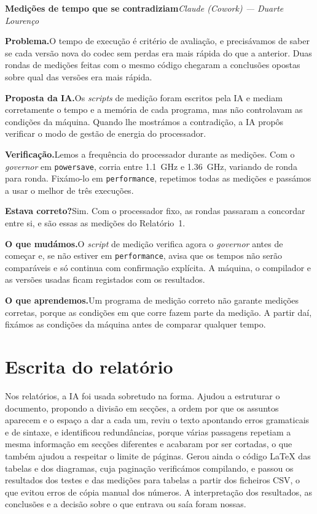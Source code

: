 \documentclass[a4paper,11pt]{article}
\newcommand{\caso}[3]{%
  \par\medskip\noindent\textbf{#1}\hfill{\small\textit{#2 --- #3}}\par\nopagebreak\smallskip}
\newcommand{\campo}[2]{\noindent\textbf{#1}\enspace #2\par}
\newcommand{\problema}[1]{\campo{Problema.}{#1}}
\newcommand{\proposta}[1]{\campo{Proposta da IA.}{#1}}
\newcommand{\verificacao}[1]{\campo{Verificação.}{#1}}
\newcommand{\correto}[1]{\campo{Estava correto?}{#1}}
\newcommand{\alteracoes}[1]{\campo{O que mudámos.}{#1}}
\newcommand{\aprendizagem}[1]{\campo{O que aprendemos.}{#1}}
\begin{document}
\caso{Medições de tempo que se contradiziam}{Claude (Cowork)}{Duarte Lourenço}
\problema{O tempo de execução é critério de avaliação, e precisávamos de saber
se cada versão nova do codec sem perdas era mais rápida do que a anterior. Duas
rondas de medições feitas com o mesmo código chegaram a conclusões opostas
sobre qual das versões era mais rápida.}
\proposta{Os \emph{scripts} de medição foram escritos pela IA e mediam
corretamente o tempo e a memória de cada programa, mas não controlavam as
condições da máquina. Quando lhe mostrámos a contradição, a IA propôs
verificar o modo de gestão de energia do processador.}
\verificacao{Lemos a frequência do processador durante as medições. Com o
\emph{governor} em \texttt{powersave}, corria entre \SI{1,1}{GHz} e
\SI{1,36}{GHz}, variando de ronda para ronda. Fixámo-lo em
\texttt{performance}, repetimos todas as medições e passámos a usar o melhor de
três execuções.}
\correto{Sim. Com o processador fixo, as rondas passaram a concordar entre si,
e são essas as medições do Relatório~1.}
\alteracoes{O \emph{script} de medição verifica agora o \emph{governor} antes de
começar e, se não estiver em \texttt{performance}, avisa que os tempos não serão
comparáveis e só continua com confirmação explícita. A máquina, o compilador e
as versões usadas ficam registados com os resultados.}
\aprendizagem{Um programa de medição correto não garante medições corretas,
porque as condições em que corre fazem parte da medição. A partir daí, fixámos
as condições da máquina antes de comparar qualquer tempo.}

\section{Escrita do relatório}
\label{sec:relatorio}
Nos relatórios, a IA foi usada sobretudo na forma. Ajudou a estruturar o
documento, propondo a divisão em secções, a ordem por que os assuntos aparecem e
o espaço a dar a cada um, reviu o texto apontando erros gramaticais e de
sintaxe, e identificou redundâncias, porque várias passagens repetiam a mesma
informação em secções diferentes e acabaram por ser cortadas, o que também
ajudou a respeitar o limite de páginas. Gerou ainda o código \LaTeX{} das
tabelas e dos diagramas, cuja paginação verificámos compilando, e passou os
resultados dos testes e das medições para tabelas a partir dos ficheiros CSV, o
que evitou erros de cópia manual dos números. A interpretação dos resultados, as
conclusões e a decisão sobre o que entrava ou saía foram nossas.
\end{document}
